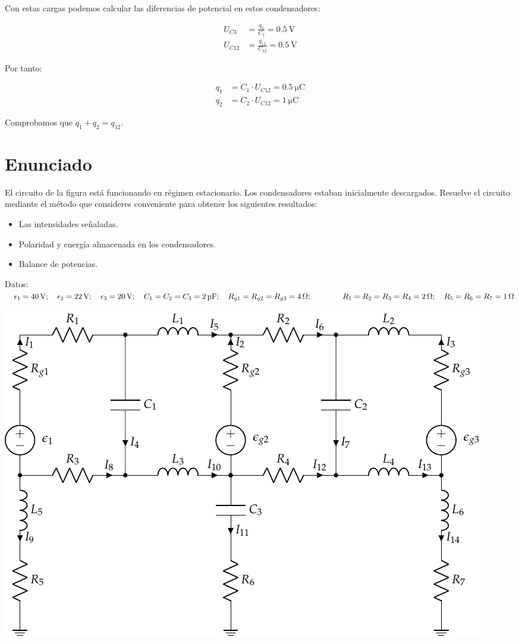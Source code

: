 Con estas cargas podemos calcular las diferencias de potencial en estos condensadores:

\vspace{-4mm}
\begin{align*}
  U_{C3} &=  \frac{q_3}{C_3} = \qty{0.5}{\volt}\\
  U_{C12} &=  \frac{q_{12}}{C_{12}} = \qty{0.5}{\volt}
\end{align*}

Por tanto:

\vspace{-5mm}
\begin{align*}
  q_1 &= C_1 \cdot U_{C12} = \boxed{\qty{0.5}{\micro\coulomb}}\\
  q_2 &= C_2 \cdot U_{C12} = \boxed{\qty{1}{\micro\coulomb}}
\end{align*}

Comprobamos que $q_1 + q_2 = q_{12}$.
\section{Enunciado}
El circuito de la figura está funcionando en régimen estacionario. Los
condensadores estaban inicialmente descargados. Resuelve el circuito
mediante el método que consideres conveniente para obtener los
siguientes resultados:
\begin{itemize}
\item Las intensidades señaladas.
\item Polaridad y energía almacenada en los condensadores.
\item Balance de potencias.
\end{itemize}
Datos:
$ \quad \epsilon_{1}=\qty{40}{\volt}; \quad \epsilon_{2}=\qty{22}{\volt}; \quad \epsilon_{3}=\qty{20}{\volt}; \quad
C_{1}=C_{2}=C_{3}=\qty{2}{\micro\farad}; \quad R_{g1}=R_{g2}=R_{g3}=\qty{4}{\ohm}; 
\\
\hspace*{14mm} R_{1}=R_{2}=R_{3}=R_{4}=\qty{2}{\ohm}; \quad R_{5}=R_{6}=R_{7}=\qty{1}{\ohm}$


\begin{center}
  \includegraphics{figuras/mallas_condensadores_bobinas.pdf}
\end{center}


